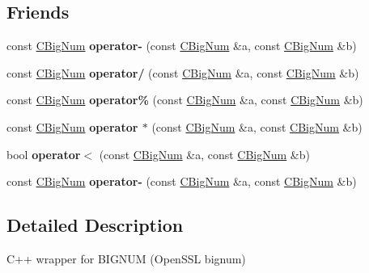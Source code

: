 \subsection*{Friends}
\begin{DoxyCompactItemize}
\item 
\mbox{\label{class_c_big_num_aeb0210adda76affb66975146b1168f71}} 
const \mbox{\hyperlink{class_c_big_num}{C\+Big\+Num}} {\bfseries operator-\/} (const \mbox{\hyperlink{class_c_big_num}{C\+Big\+Num}} \&a, const \mbox{\hyperlink{class_c_big_num}{C\+Big\+Num}} \&b)
\item 
\mbox{\label{class_c_big_num_ac5a9fb08b1522f0cbcc30f87bac72f4b}} 
const \mbox{\hyperlink{class_c_big_num}{C\+Big\+Num}} {\bfseries operator/} (const \mbox{\hyperlink{class_c_big_num}{C\+Big\+Num}} \&a, const \mbox{\hyperlink{class_c_big_num}{C\+Big\+Num}} \&b)
\item 
\mbox{\label{class_c_big_num_a8abffdb8b9ce531fef9fc3067d7329ef}} 
const \mbox{\hyperlink{class_c_big_num}{C\+Big\+Num}} {\bfseries operator\%} (const \mbox{\hyperlink{class_c_big_num}{C\+Big\+Num}} \&a, const \mbox{\hyperlink{class_c_big_num}{C\+Big\+Num}} \&b)
\item 
\mbox{\label{class_c_big_num_a13401e5870de07251f76a199ca1b152f}} 
const \mbox{\hyperlink{class_c_big_num}{C\+Big\+Num}} {\bfseries operator $\ast$} (const \mbox{\hyperlink{class_c_big_num}{C\+Big\+Num}} \&a, const \mbox{\hyperlink{class_c_big_num}{C\+Big\+Num}} \&b)
\item 
\mbox{\label{class_c_big_num_a6db3085f36d565f1dd8589c8386d3a2f}} 
bool {\bfseries operator$<$} (const \mbox{\hyperlink{class_c_big_num}{C\+Big\+Num}} \&a, const \mbox{\hyperlink{class_c_big_num}{C\+Big\+Num}} \&b)
\item 
\mbox{\label{class_c_big_num_aeb0210adda76affb66975146b1168f71}} 
const \mbox{\hyperlink{class_c_big_num}{C\+Big\+Num}} {\bfseries operator-\/} (const \mbox{\hyperlink{class_c_big_num}{C\+Big\+Num}} \&a, const \mbox{\hyperlink{class_c_big_num}{C\+Big\+Num}} \&b)
\end{DoxyCompactItemize}


\subsection{Detailed Description}
C++ wrapper for B\+I\+G\+N\+UM (Open\+S\+SL bignum) 

